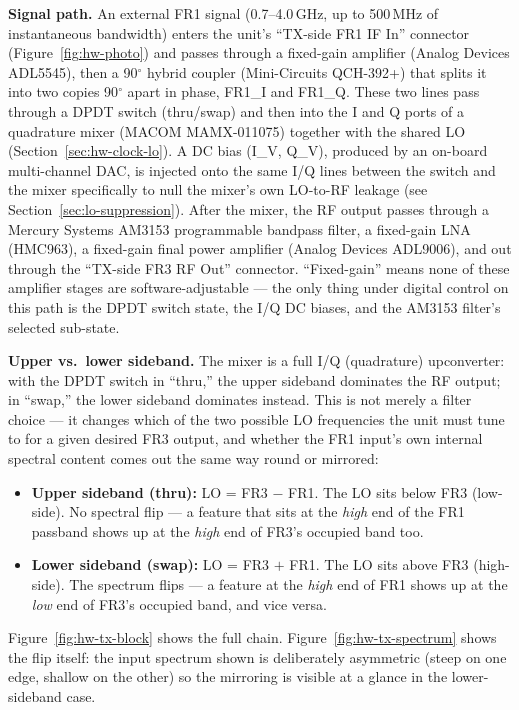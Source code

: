 \textbf{Signal path.} An external FR1 signal (0.7--4.0\,GHz, up to 500\,MHz of instantaneous bandwidth) enters the unit's
``TX-side FR1 IF In'' connector (Figure~\ref{fig:hw-photo}) and passes through a fixed-gain amplifier (Analog
Devices ADL5545), then a 90$^\circ$ hybrid
coupler (Mini-Circuits QCH-392+) that splits it into two copies 90$^\circ$ apart in phase, FR1\_I and FR1\_Q.
These two lines pass through a DPDT switch (thru/swap) and then into the I and Q ports of a quadrature mixer
(MACOM MAMX-011075) together with the shared LO (Section~\ref{sec:hw-clock-lo}). A DC bias (I\_V, Q\_V),
produced by an on-board multi-channel DAC, is injected onto the same I/Q lines between the switch and the mixer specifically
to null the mixer's own LO-to-RF leakage (see Section~\ref{sec:lo-suppression}). After the mixer, the RF output
passes through a Mercury Systems AM3153 programmable bandpass filter, a fixed-gain LNA (HMC963), a fixed-gain final power amplifier
(Analog Devices ADL9006), and out through the ``TX-side FR3 RF Out'' connector. ``Fixed-gain'' means none of these
amplifier stages are software-adjustable --- the only thing under digital control on this path is the DPDT
switch state, the I/Q DC biases, and the AM3153 filter's selected sub-state.

\textbf{Upper vs.\ lower sideband.} The mixer is a full I/Q (quadrature) upconverter: with the DPDT switch in
``thru,'' the upper sideband dominates the RF output; in ``swap,'' the lower sideband dominates instead. This is
not merely a filter choice --- it changes which of the two possible LO frequencies the unit must tune to for a
given desired FR3 output, and whether the FR1 input's own internal spectral content comes out the same way
round or mirrored:
{\setlength{\topsep}{0.2em}\setlength{\partopsep}{0pt}\begin{itemize}\setlength{\itemsep}{0.3em}\setlength{\parskip}{0pt}
\item \textbf{Upper sideband (thru):} LO = FR3 $-$ FR1. The LO sits below FR3 (low-side). No spectral flip --- a
feature that sits at the \emph{high} end of the FR1 passband shows up at the \emph{high} end of FR3's occupied
band too.
\item \textbf{Lower sideband (swap):} LO = FR3 $+$ FR1. The LO sits above FR3 (high-side). The spectrum flips
--- a feature at the \emph{high} end of FR1 shows up at the \emph{low} end of FR3's occupied band, and vice
versa.
\end{itemize}}
Figure~\ref{fig:hw-tx-block} shows the full chain. Figure~\ref{fig:hw-tx-spectrum} shows the flip itself: the
input spectrum shown is deliberately asymmetric (steep on one edge, shallow on the other) so the mirroring is
visible at a glance in the lower-sideband case.

